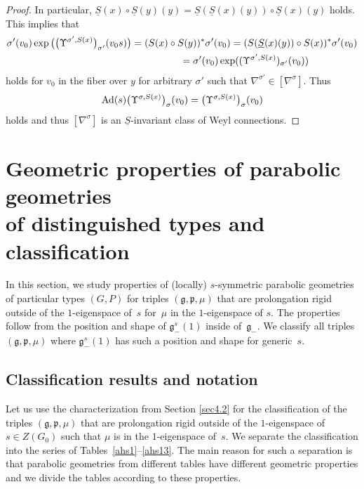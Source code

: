 \documentclass[10pt,a4paper]{amsart}
\newcommand{\si}{\sigma}
\newcommand{\un}{\underline}
\newcommand{\fg}{\mathfrak g}
\newcommand{\fp}{\mathfrak p}
\newcommand{\Ad}{{\rm Ad}}
\newcommand{\U}{\Upsilon}
\numberwithin{equation}{section}
\begin{document}
\begin{proof}
In particular, $\un S(x)\circ \un S(y)(y)=\un S(\un S(x)(y)) \circ \un S(x)(y)$ holds. This implies that
\begin{gather*}
\si'(v_0)\exp\big(\big(\U^{\si',S(x)}\big)_{\si'}(v_0s)\big) =(S(x)\circ S(y))^*\si'(v_0)=(S(\un S(x)(y))\circ S(x))^*\si'(v_0)\\
\hphantom{\si'(v_0)\exp\big(\big(\U^{\si',S(x)}\big)_{\si'}(v_0s)\big)}{} =\si'(v_0)\exp((\U^{\si',S(x)})_{\si'}(v_0))
\end{gather*}
holds for $v_0$ in the f\/iber over $y$ for arbitrary $\si'$ such that $\nabla^{\si'}\in [\nabla^\si]$. Thus
\begin{gather*}\Ad(s)\big(\U^{\si,S(x)}\big)_\si(v_0)=\big(\U^{\si,S(x)}\big)_\si(v_0)\end{gather*} holds and thus $[\nabla^\si]$ is an $\un S$-invariant class of Weyl connections.
\end{proof}

\section[Geometric properties of parabolic geometries of distinguished types and classif\/ication]{Geometric properties of parabolic geometries\\ of distinguished types and classif\/ication} \label{sec6}

In this section, we study properties of (locally) $s$-symmetric parabolic geometries of particular types $(G,P)$ for triples $(\fg,\fp,\mu)$ that are prolongation rigid outside of the $1$-eigenspace of~$s$ for~$\mu$ in the $1$-eigenspace of $s$. The properties follow from the position and shape of $\fg_-^s(1)$ inside of~$\fg_-$. We classify all triples $(\fg,\fp,\mu)$ where $\fg_-^s(1)$ has such a position and shape for generic~$s$.

\subsection{Classif\/ication results and notation}\label{sec61}

Let us use the characterization from Section \ref{sec4.2} for the classif\/ication of the triples $(\fg,\fp,\mu)$ that are prolongation rigid outside of the $1$-eigenspace of $s\in Z(G_0)$ such that $\mu$ is in the $1$-eigenspace of~$s$. We separate the classif\/ication into the series of Tables~\ref{ahs1}--\ref{ahs13}.
The main reason for such a separation is that parabolic geometries from dif\/ferent tables have dif\/ferent geometric properties and we divide the tables according to these properties.
\end{document}

